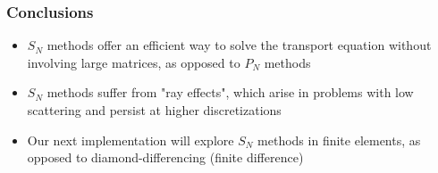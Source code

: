 \begin{frame}
      \frametitle{Conclusions}
      \begin{itemize}
            \item $S_N$ methods offer an efficient way to solve the transport
                  equation without involving large matrices, as opposed to $P_N$
                  methods
            \item $S_N$ methods suffer from "ray effects", which arise in
                  problems with low scattering and persist at higher discretizations
            \item Our next implementation will explore $S_N$ methods in finite
                  elements, as opposed to diamond-differencing (finite difference)
      \end{itemize}
\end{frame}

